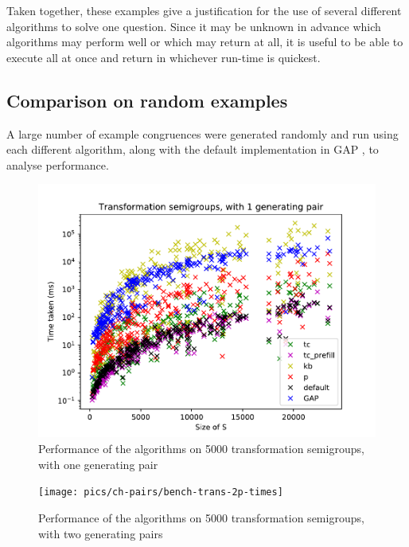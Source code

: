 Taken together, these examples give a justification for the use of several
different algorithms to solve one question.  Since it may be unknown in advance
which algorithms may perform well or which may return at all, it is useful to be
able to execute all at once and return in whichever run-time is quickest.

\subsection{Comparison on random examples}
A large number of example congruences were generated randomly and run using each
different algorithm, along with the default implementation in GAP \cite{gap}, to
analyse performance.

\begin{figure}[h]
  \centering
  \includegraphics[width=\textwidth]{pics/ch-pairs/bench-trans-1p-times}
  \caption{Performance of the algorithms on 5000 transformation semigroups, with
    one generating pair}
  \label{fig:bench-trans-1p-times}
\end{figure}

\begin{figure}[h]
  \centering
  \texttt{[image: pics/ch-pairs/bench-trans-2p-times]}
  \caption{Performance of the algorithms on 5000 transformation semigroups, with
    two generating pairs}
  \label{fig:bench-trans-2p-times}
\end{figure}

